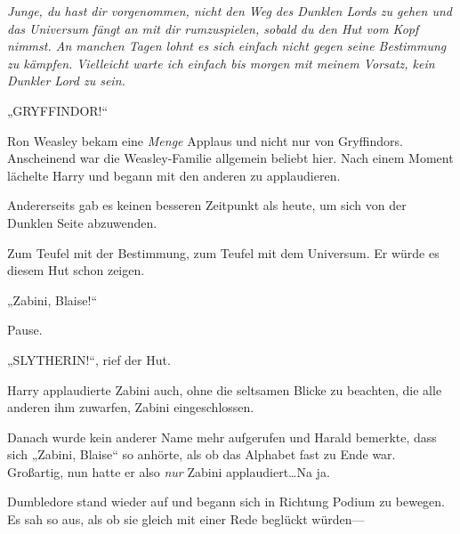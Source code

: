 \emph{Junge, du hast dir vorgenommen, nicht den Weg des Dunklen Lords zu gehen und das Universum fängt an mit dir rumzuspielen, sobald du den Hut vom Kopf nimmst. An manchen Tagen lohnt es sich einfach nicht gegen seine Bestimmung zu kämpfen. Vielleicht warte ich einfach bis morgen mit meinem Vorsatz, kein Dunkler Lord zu sein.}

„GRYFFINDOR!“

Ron Weasley bekam eine \emph{Menge} Applaus und nicht nur von Gryffindors. Anscheinend war die Weasley-Familie allgemein beliebt hier. Nach einem Moment lächelte Harry und begann mit den anderen zu applaudieren.

Andererseits gab es keinen besseren Zeitpunkt als heute, um sich von der Dunklen Seite abzuwenden.

Zum Teufel mit der Bestimmung, zum Teufel mit dem Universum. Er würde es diesem Hut schon zeigen.

„Zabini, Blaise!“

Pause.

„SLYTHERIN!“, rief der Hut.

Harry applaudierte Zabini auch, ohne die seltsamen Blicke zu beachten, die alle anderen ihm zuwarfen, Zabini eingeschlossen.

Danach wurde kein anderer Name mehr aufgerufen und Harald bemerkte, dass sich „Zabini, Blaise“ so anhörte, als ob das Alphabet fast zu Ende war. Großartig, nun hatte er also \emph{nur} Zabini applaudiert…Na ja.

Dumbledore stand wieder auf und begann sich in Richtung Podium zu bewegen. Es sah so aus, als ob sie gleich mit einer Rede beglückt würden—

